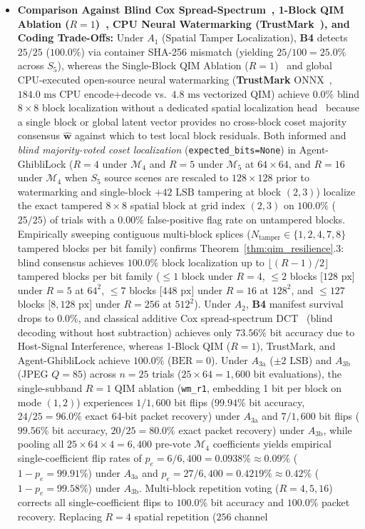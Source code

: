 \documentclass[conference,10pt]{IEEEtran}
\begin{document}
\begin{itemize}
    \item \textbf{Comparison Against Blind Cox Spread-Spectrum~\cite{cox1997}, 1-Block QIM Ablation ($R=1$)~\cite{chen2001}, CPU Neural Watermarking (TrustMark~\cite{bui2023trustmark}), and Coding Trade-Offs:} Under $A_1$ (Spatial Tamper Localization), \textbf{B4} detects $25/25$ ($100.0\%$) via container SHA-256 mismatch (yielding $25/100 = 25.0\%$ across $S_5$), whereas the Single-Block QIM Ablation ($R=1$)~\cite{chen2001} and global CPU-executed open-source neural watermarking (\textbf{TrustMark} ONNX~\cite{bui2023trustmark}, $184.0\text{ ms}$ CPU encode+decode vs.\ $4.8\text{ ms}$ vectorized QIM) achieve $0.0\%$ blind $8\times 8$ block localization without a dedicated spatial localization head~\cite{sander2025wam} because a single block or global latent vector provides no cross-block coset majority consensus $\hat{\mathbf{w}}$ against which to test local block residuals. Both informed and \emph{blind majority-voted coset localization} (\texttt{expected\_bits=None}) in Agent-GhibliLock ($R=4$ under $\mathcal{M}_4$ and $R=5$ under $\mathcal{M}_5$ at $64\times 64$, and $R=16$ under $\mathcal{M}_4$ when $S_5$ source scenes are rescaled to $128\times 128$ prior to watermarking and single-block $+42\text{ LSB}$ tampering at block $(2,3)$) localize the exact tampered $8\times 8$ spatial block at grid index $(2,3)$ on $100.0\%$ ($25/25$) of trials with a $0.00\%$ false-positive flag rate on untampered blocks. Empirically sweeping contiguous multi-block splices ($N_{\text{tamper}} \in \{1, 2, 4, 7, 8\}$ tampered blocks per bit family) confirms Theorem~\ref{thm:qim_resilience}.3: blind consensus achieves $100.0\%$ block localization up to $\lfloor(R-1)/2\rfloor$ tampered blocks per bit family ($\le 1$ block under $R=4$, $\le 2$ blocks [$128\text{ px}$] under $R=5$ at $64^2$, $\le 7$ blocks [$448\text{ px}$] under $R=16$ at $128^2$, and $\le 127$ blocks [$8{,}128\text{ px}$] under $R=256$ at $512^2$). Under $A_2$, \textbf{B4} manifest survival drops to $0.0\%$, and classical additive Cox spread-spectrum DCT~\cite{cox1997} (blind decoding without host subtraction) achieves only $73.56\%$ bit accuracy due to Host-Signal Interference, whereas 1-Block QIM ($R=1$), TrustMark, and Agent-GhibliLock achieve $100.0\%$ ($\mathrm{BER}=0$). Under $A_{3\text{a}}$ ($\pm 2\text{ LSB}$) and $A_{3\text{b}}$ (JPEG $Q=85$) across $n=25$ trials ($25\times 64 = 1{,}600$ bit evaluations), the single-subband $R=1$ QIM ablation (\texttt{wm\_r1}, embedding 1 bit per block on mode $(1,2)$) experiences $1/1{,}600$ bit flips ($99.94\%$ bit accuracy, $24/25 = 96.0\%$ exact 64-bit packet recovery) under $A_{3\text{a}}$ and $7/1{,}600$ bit flips ($99.56\%$ bit accuracy, $20/25 = 80.0\%$ exact packet recovery) under $A_{3\text{b}}$, while pooling all $25\times 64\times 4 = 6{,}400$ pre-vote $\mathcal{M}_4$ coefficients yields empirical single-coefficient flip rates of $p_e = 6/6{,}400 = 0.0938\% \approx 0.09\%$ ($1 - p_e = 99.91\%$) under $A_{3\text{a}}$ and $p_e = 27/6{,}400 = 0.4219\% \approx 0.42\%$ ($1 - p_e = 99.58\%$) under $A_{3\text{b}}$. Multi-block repetition voting ($R=4, 5, 16$) corrects all single-coefficient flips to $100.0\%$ bit accuracy and $100.0\%$ packet recovery. Replacing $R=4$ spatial repetition ($256$ channel 
\end{itemize}
\end{document}
